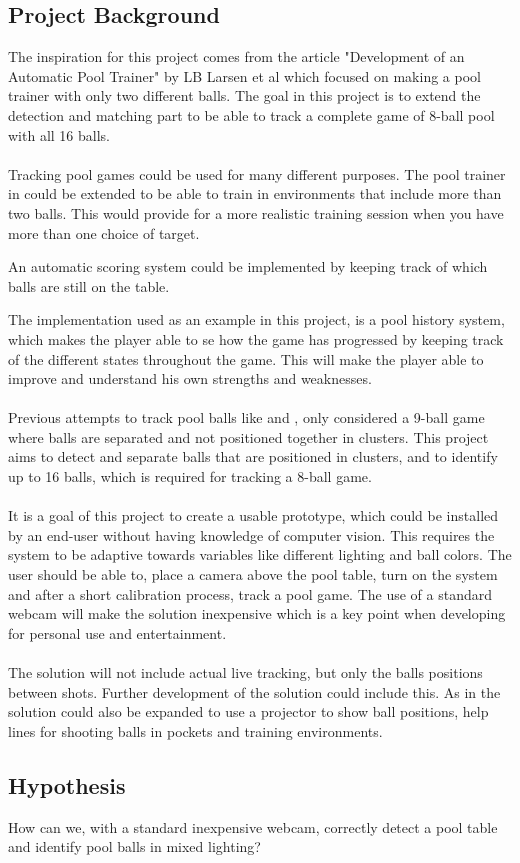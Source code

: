 \subsection{Project Background}
The inspiration for this project comes from the article "Development of an Automatic Pool Trainer"\cite{larsbopool} by LB Larsen et al which focused on making a pool trainer with only two different balls. The goal in this project is to extend the detection and matching part to be able to track a complete game of 8-ball pool with all 16 balls.
\\\\
Tracking pool games could be used for many different purposes. The pool trainer in \cite{larsbopool} could be extended to be able to train in environments that include more than two balls. This would provide for a more realistic training session when you have more than one choice of target. 

An automatic scoring system could be implemented by keeping track of which balls are still on the table.

The implementation used as an example in this project, is a pool history system, which makes the player able to se how the game has progressed by keeping track of the different states throughout the game. This will make the player able to improve and understand his own strengths and weaknesses.
\\\\
Previous attempts to track pool balls like \cite{supportBilliard} and \cite{ARPool}, only considered a 9-ball game where balls are separated and not positioned together in clusters. This project aims to detect and separate balls that are positioned in clusters, and to identify up to 16 balls, which is required for tracking a 8-ball game.
\\\\
It is a goal of this project to create a usable prototype, which could be installed by an end-user without having knowledge of computer vision. This requires the system to be adaptive towards variables like different lighting and ball colors. The user should be able to, place a camera above the pool table, turn on the system and after a short calibration process, track a pool game. The use of a standard webcam will make the solution inexpensive which is a key point when developing for personal use and entertainment.
\\\\
The solution will not include actual live tracking, but only the balls positions between shots. Further development of the solution could include this. As in \cite{larsbopool} the solution could also be expanded to use a projector to show ball positions, help lines for shooting balls in pockets and training environments. 

\subsection{Hypothesis}
How can we, with a standard inexpensive webcam, correctly detect a pool table and identify pool balls in mixed lighting?